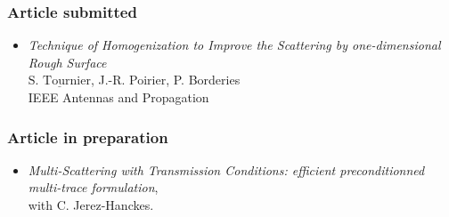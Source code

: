 \documentclass[a4paper,10pt,twoside]{article}
\newcommand\moi{$\underline{\textrm{S. Tournier}}$}
\begin{document}

\vspace{-0.65cm}

\subsubsection*{Article submitted}
\begin{itemize}
\item[\textbullet]
  \emph{Technique of Homogenization to Improve the Scattering by one-dimensional
    Rough Surface}\\
  \moi, J.-R. Poirier, P. Borderies\\
  \textsf{IEEE Antennas and Propagation}
  \\
\end{itemize}

\vspace{-0.65cm}

\subsubsection*{Article in preparation}
\begin{itemize}
\item[\textbullet]
  \emph{Multi-Scattering with Transmission Conditions: efficient
    preconditionned multi-trace formulation},\\
  with \textsf{C. Jerez-Hanckes}.
\end{itemize}

\vspace{-0.45cm}
\end{document}
